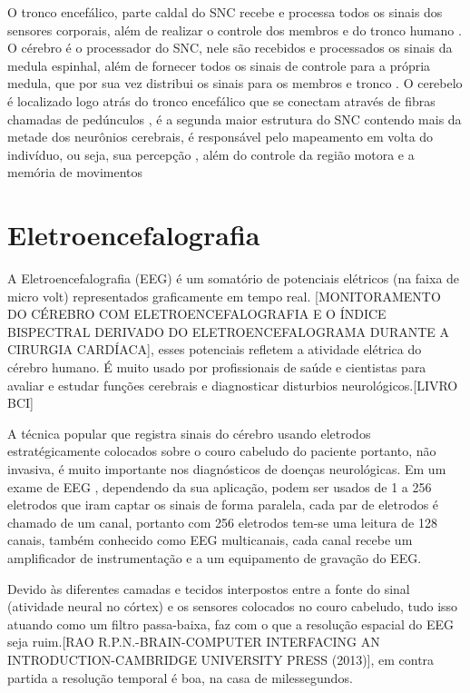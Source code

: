 O tronco encefálico, parte caldal do SNC recebe e processa todos os sinais dos sensores corporais, além de realizar o controle dos membros e do tronco humano \cite{KANDEL}.
O cérebro é o processador do SNC, nele são recebidos e processados os sinais da medula espinhal, além de fornecer todos os sinais de controle para a própria medula, que por sua vez distribui os sinais para os membros e tronco \cite{KANDEL}.
O cerebelo é localizado logo atrás do tronco encefálico que se conectam através de fibras chamadas de pedúnculos \cite{KANDEL}, é a segunda maior estrutura do SNC contendo mais da metade dos neurônios cerebrais, \cite{SIULYDissertacao} é responsável pelo mapeamento em volta do indivíduo, ou seja, sua percepção \cite{alvarezneurobiomecanismos}, além do controle da região motora e a memória de movimentos \cite{SIULYDissertacao,alvarezneurobiomecanismos}

\section{Eletroencefalografia}
A Eletroencefalografia (EEG) é um somatório de potenciais elétricos
 (na faixa de micro volt) representados graficamente em tempo real.
 [MONITORAMENTO DO CÉREBRO COM ELETROENCEFALOGRAFIA E O ÍNDICE BISPECTRAL
 DERIVADO DO ELETROENCEFALOGRAMA DURANTE A CIRURGIA CARDÍACA], esses potenciais
 refletem a atividade elétrica do cérebro humano. É muito usado por profissionais
 de saúde e cientistas para avaliar e estudar funções cerebrais e diagnosticar
 disturbios neurológicos.[LIVRO BCI] 

A técnica popular que registra sinais do cérebro usando eletrodos estratégicamente
 colocados sobre o couro cabeludo do paciente portanto, não invasiva, é muito
 importante nos diagnósticos de doenças neurológicas. Em um exame de EEG ,
 dependendo da sua aplicação, podem ser usados de 1 a 256 eletrodos que iram
 captar os sinais de forma paralela, cada par de eletrodos é chamado de um canal,
 portanto com 256 eletrodos tem-se uma leitura de 128 canais, também conhecido como
 EEG multicanais, cada canal recebe um amplificador de instrumentação e a um equipamento
 de gravação do EEG.

Devido às diferentes camadas e tecidos interpostos entre a fonte do sinal
 (atividade neural no córtex) e os sensores colocados no couro cabeludo,
 tudo isso atuando como um filtro passa-baixa, faz com o que a resolução
 espacial do EEG seja ruim.[RAO R.P.N.-BRAIN-COMPUTER INTERFACING AN
 INTRODUCTION-CAMBRIDGE UNIVERSITY PRESS (2013)], em contra partida a
 resolução temporal é boa, na casa de milessegundos.

